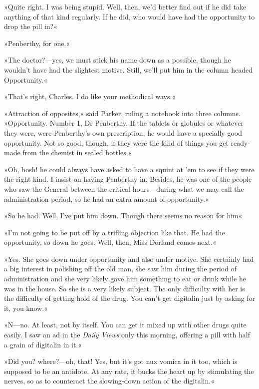 »Quite right. I was being stupid. Well, then, we'd better find out if he did take anything of that kind regularly. If he did, who would have had the opportunity to drop the pill in?«

»Penberthy, for one.«

»The doctor?—yes, we must stick his name down as a possible, though he wouldn't have had the slightest motive. Still, we'll put him in the column headed Opportunity.«

»That's right, Charles. I do like your methodical ways.«

»Attraction of opposites,« said Parker, ruling a notebook into three columns. »Opportunity. Number 1, Dr Penberthy. If the tablets or globules or whatever they were, were Penberthy's own prescription, he would have a specially good opportunity. Not so good, though, if they were the kind of things you get ready-made from the chemist in sealed bottles.«

»Oh, bosh! he could always have asked to have a squint at 'em to see if they were the right kind. I insist on having Penberthy in. Besides, he was one of the people who saw the General between the critical hours—during what we may call the administration period, so he had an extra amount of opportunity.«

»So he had. Well, I've put him down. Though there seems no reason for him\longdash«

»I'm not going to be put off by a trifling objection like that. He had the opportunity, so down he goes. Well, then, Miss Dorland comes next.«

»Yes. She goes down under opportunity and also under motive. She certainly had a big interest in polishing off the old man, she saw him during the period of administration and she very likely gave him something to eat or drink while he was in the house. So she is a very likely subject. The only difficulty with her is the difficulty of getting hold of the drug. You can't get digitalin just by asking for it, you know.«

»N—no. At least, not by itself. You can get it mixed up with other drugs quite easily. I saw an ad in the \textit{Daily Views} only this morning, offering a pill with half a grain of digitalin in it.«

»Did you? where?—oh, that! Yes, but it's got nux vomica in it too, which is supposed to be an antidote. At any rate, it bucks the heart up by stimulating the nerves, so as to counteract the slowing-down action of the digitalin.«


